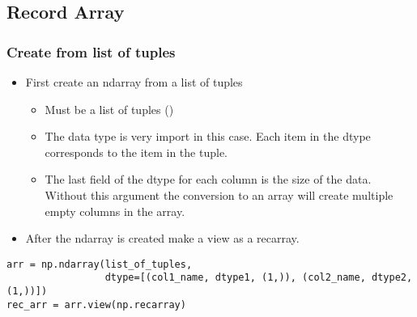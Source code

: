 \subsection{Record Array}
%
\subsubsection{Create from list of tuples}
\begin{itemize}
  \item First create an ndarray from a list of tuples
    \begin{itemize}
      \item Must be a list of tuples
        ({\color{red}{list of lists will not work}})
      \item The data type is very import in this case. Each item in the dtype
        corresponds to the item in the tuple.
      \item The last field of the dtype for each column is the size of the data.
        Without this argument the conversion to an array will create multiple
        empty columns in the array.
    \end{itemize}
  \item After the ndarray is created make a view as a recarray.
\end{itemize}
\begin{lstlisting}[basicstyle=\bfseries\footnotesize]
arr = np.ndarray(list_of_tuples,
                 dtype=[(col1_name, dtype1, (1,)), (col2_name, dtype2, (1,))])
rec_arr = arr.view(np.recarray)
\end{lstlisting}
